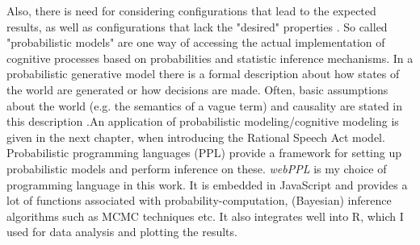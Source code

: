 Also, there is need for considering configurations that lead to the expected results, as well as configurations that lack the "desired" properties \citep{steels2006experiments}. So called "probabilistic models" are one way of accessing the actual implementation of cognitive processes based on probabilities and statistic inference mechanisms. In a probabilistic generative model there is a formal description about how states of the world are generated or how decisions are made. Often, basic assumptions about the world (e.g. the semantics of a vague term) and causality are stated in this description \citep{probmods2}.An application of probabilistic modeling/cognitive modeling is given in the next chapter, when introducing the Rational Speech Act model.\\

Probabilistic programming languages (PPL) provide a framework for setting up
probabilistic models and perform inference on these.
\textit{webPPL} \citep[by][]{dippl} is my choice of programming language in this work. It is embedded in JavaScript and provides a lot of functions associated with probability-computation, (Bayesian) inference algorithms such as MCMC techniques etc. It also integrates well into R, which I used for data analysis and plotting the results. 